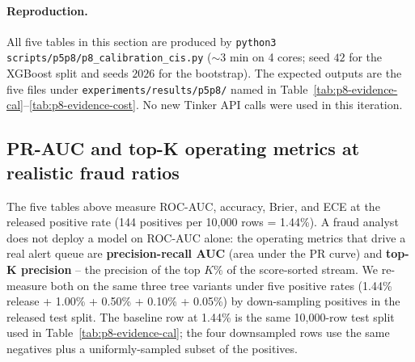 \documentclass{article}
\providecommand{\tableref}[1]{Table~\ref{#1}}
\begin{document}
\paragraph{Reproduction.} All five tables in this section are produced
by \texttt{python3 scripts/p5p8/p8\_calibration\_cis.py} ($\sim$3 min on
4 cores; seed $42$ for the XGBoost split and seeds $2026$ for the
bootstrap). The expected outputs are the five files under
\texttt{experiments/results/p5p8/} named in
\tableref{tab:p8-evidence-cal}--\ref{tab:p8-evidence-cost}. No new
Tinker API calls were used in this iteration.

\subsection{PR-AUC and top-K operating metrics at realistic fraud ratios}
\label{sec:p8-evidence-realistic-ratios}

The five tables above measure ROC-AUC, accuracy, Brier, and ECE at the
released positive rate (144 positives per 10{,}000 rows = 1.44\%). A
fraud analyst does not deploy a model on ROC-AUC alone: the operating
metrics that drive a real alert queue are \textbf{precision-recall AUC}
(area under the PR curve) and \textbf{top-K precision} -- the precision
of the top $K\%$ of the score-sorted stream. We re-measure both on the
same three tree variants under five positive rates (1.44\% release +
1.00\% + 0.50\% + 0.10\% + 0.05\%) by down-sampling positives in the
released test split. The baseline row at 1.44\% is the same 10{,}000-row
test split used in \tableref{tab:p8-evidence-cal}; the four downsampled
rows use the same negatives plus a uniformly-sampled subset of the
positives.
\end{document}
